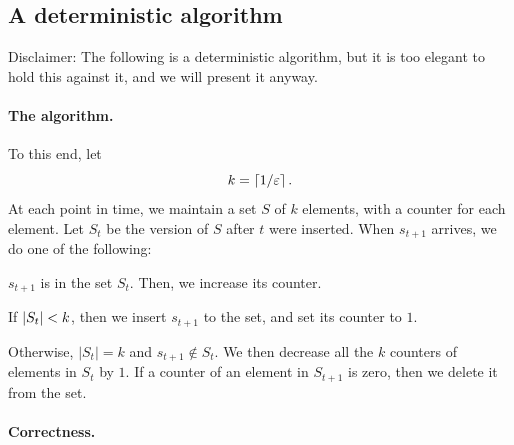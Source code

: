 \subsection{A deterministic algorithm}
Disclaimer: The following is a deterministic algorithm, but it is too
elegant to hold this against it, and we will present it anyway.


\paragraph*{The algorithm.}
To this end, let
\begin{equation*}
    k = \left\lceil {1/{\varepsilon}} \right\rceil. 
\end{equation*}
At each point in time, we maintain a set $S$ of $k$ elements, with a
counter for each element. Let $S_t$ be the version of $S$ after $t$ were
inserted. When $s_{t+1}$ arrives, we do one of the following:
\begin{compactenumA}
    \smallskip%
    \item $s_{t+1}$ is in the set $S_t$. Then, we increase its counter.

    \smallskip%
    \item If $\left| {S_t} \right| < k$, then we insert $s_{t+1}$ to the set, and
    set its counter to $1$.

    \smallskip%
    \item Otherwise, $|S_t|=k$ and $s_{t+1} \notin S_t$. We then decrease
    all the $k$ counters of elements in $S_t$ by $1$. If a counter of an
    element in $S_{t+1}$ is zero, then we delete it from the set.
\end{compactenumA}
    


\paragraph*{Correctness.}

